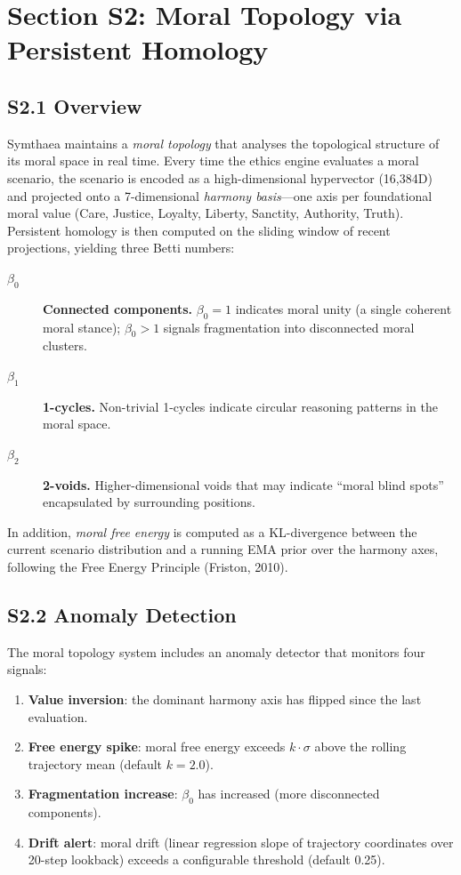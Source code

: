 \documentclass[10pt,landscape]{article}
\begin{document}
\newpage
\section*{Section S2: Moral Topology via Persistent Homology}

\subsection*{S2.1 Overview}

Symthaea maintains a \emph{moral topology} that analyses the topological structure of its moral space in real time.  Every time the ethics engine evaluates a moral scenario, the scenario is encoded as a high-dimensional hypervector (16,384D) and projected onto a 7-dimensional \emph{harmony basis}---one axis per foundational moral value (Care, Justice, Loyalty, Liberty, Sanctity, Authority, Truth).  Persistent homology is then computed on the sliding window of recent projections, yielding three Betti numbers:

\begin{description}
  \item[$\beta_0$] \textbf{Connected components.}  $\beta_0 = 1$ indicates moral unity (a single coherent moral stance); $\beta_0 > 1$ signals fragmentation into disconnected moral clusters.
  \item[$\beta_1$] \textbf{1-cycles.}  Non-trivial 1-cycles indicate circular reasoning patterns in the moral space.
  \item[$\beta_2$] \textbf{2-voids.}  Higher-dimensional voids that may indicate ``moral blind spots'' encapsulated by surrounding positions.
\end{description}

\noindent In addition, \emph{moral free energy} is computed as a KL-divergence between the current scenario distribution and a running EMA prior over the harmony axes, following the Free Energy Principle (Friston, 2010).

\subsection*{S2.2 Anomaly Detection}

The moral topology system includes an anomaly detector that monitors four signals:

\begin{enumerate}
  \item \textbf{Value inversion}: the dominant harmony axis has flipped since the last evaluation.
  \item \textbf{Free energy spike}: moral free energy exceeds $k \cdot \sigma$ above the rolling trajectory mean (default $k = 2.0$).
  \item \textbf{Fragmentation increase}: $\beta_0$ has increased (more disconnected components).
  \item \textbf{Drift alert}: moral drift (linear regression slope of trajectory coordinates over 20-step lookback) exceeds a configurable threshold (default 0.25).
\end{enumerate}
\end{document}
